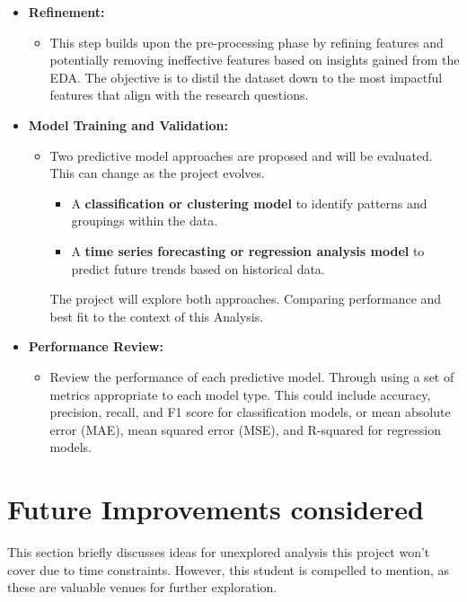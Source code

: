 \documentclass[12pt, a4paper]{article}
\begin{document}
\begin{itemize}
        \item \textbf{Refinement:}
        \begin{itemize}
            \item This step builds upon the pre-processing phase by refining features and potentially removing ineffective features based on insights gained from the EDA.
            \newline The objective is to distil the dataset down to the most impactful features that align with the research questions.
        \end{itemize}
        \item \textbf{Model Training and Validation:}
        \begin{itemize}
            \item Two predictive model approaches are proposed and will be evaluated. This can change as the project evolves.
            \begin{itemize}
                \item  A \textbf{classification or clustering model} to identify patterns and groupings within the data.
                \item A \textbf{time series forecasting or regression analysis model} to predict future trends based on historical data.
            \end{itemize}
            The project will explore both approaches. Comparing performance and best fit to the context of this Analysis.

        \end{itemize}
        \item \textbf{Performance Review:}
        \begin{itemize}
            \item Review the performance of each predictive model. Through using a set of metrics appropriate to each model type.
            \newline This could include accuracy, precision, recall, and F1 score for classification models, or mean absolute error (MAE), mean squared error (MSE), and R-squared for regression models.
        \end{itemize}
    \end{itemize}

    \section*{Future Improvements considered}
    \label{sec:future}
    This section briefly discusses ideas for unexplored analysis this project won't cover due to time constraints. However, this student is compelled to mention, as these are valuable venues for further exploration.
\end{document}
